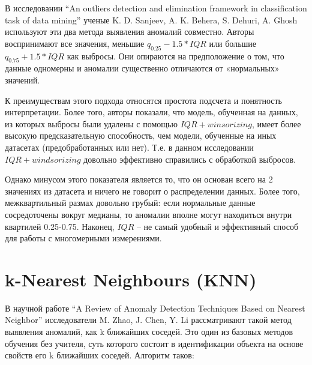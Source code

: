 \documentclass[14pt, letterpaper]{extarticle}
\begin{document}
В исследовании “An outliers detection and elimination framework in classification task of data mining” ученые K. D. Sanjeev, A. K. Behera, S. Dehuri, A. Ghosh \cite{dash2023outliers} используют эти два метода выявления аномалий совместно. Авторы воспринимают все значения, меньшие $q_{0.25}-1.5*IQR$ или большие $q_{0.75}+1.5*IQR$ как выбросы. Они опираются на предположение о том, что данные одномерны и аномалии существенно отличаются от «нормальных» значений.

К преимуществам этого подхода относятся простота подсчета и понятность интерпретации. Более того, авторы показали, что модель, обученная на данных, из которых выбросы были удалены с помощью $IQR + winsorizing$, имеет более высокую предсказательную способность, чем модели, обученные на иных датасетах (предобработанных или нет). Т.е. в данном исследовании $IQR + windsorizing$ довольно эффективно справились с обработкой выбросов. 

Однако минусом этого показателя является то, что он основан всего на 2 значениях из датасета и ничего не говорит о распределении данных. Более того, межквартильный размах довольно грубый: если нормальные данные сосредоточены вокруг медианы, то аномалии вполне могут находиться внутри квартилей 0.25-0.75. Наконец, $IQR$ – не самый удобный и эффективный способ для работы с многомерными измерениями. 

\section{k-Nearest Neighbours (KNN)}

В научной работе “A Review of Anomaly Detection Techniques Based on Nearest Neighbor” исследователи M. Zhao, J. Chen, Y. Li \cite{zhao2018review} рассматривают такой метод выявления аномалий, как k ближайших соседей. Это один из базовых методов обучения без учителя, суть которого состоит в идентификации объекта на основе свойств его k ближайших соседей. Алгоритм таков: 
\end{document}
